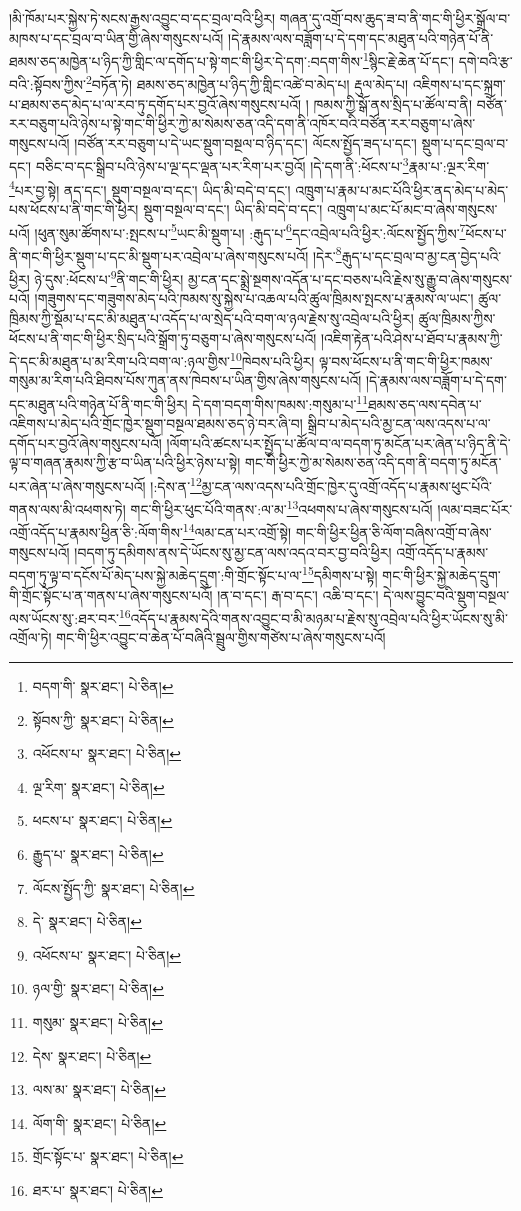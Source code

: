 །མི་ཁོམ་པར་སྐྱེས་ཏེ་སངས་རྒྱས་འབྱུང་བ་དང་བྲལ་བའི་ཕྱིར། གཞན་དུ་འགྲོ་བས་ཆུད་ཟ་བ་ནི་གང་གི་ཕྱིར་སྒྲོལ་བ་མཁས་པ་དང་བྲལ་བ་ཡིན་གྱི་ཞེས་གསུངས་པའོ། །དེ་རྣམས་ལས་བཟློག་པ་དེ་དག་དང་མཐུན་པའི་གཉེན་པོ་ནི་ཐམས་ཅད་མཁྱེན་པ་ཉིད་ཀྱི་གླིང་ལ་དགོད་པ་སྟེ་གང་གི་ཕྱིར་དེ་དག་:བདག་གིས་\footnote{བདག་གི་  སྣར་ཐང་།  པེ་ཅིན། }སྙིང་རྗེ་ཆེན་པོ་དང་། དགེ་བའི་རྩ་བའི་:སྟོབས་ཀྱིས་\footnote{སྟོབས་ཀྱི་  སྣར་ཐང་།  པེ་ཅིན། }བཏོན་ཏེ། ཐམས་ཅད་མཁྱེན་པ་ཉིད་ཀྱི་གླིང་འཚེ་བ་མེད་པ། རྡུལ་མེད་པ། འཇིགས་པ་དང་སྐྲག་པ་ཐམས་ཅད་མེད་པ་ལ་རབ་ཏུ་དགོད་པར་བྱའོ་ཞེས་གསུངས་པའོ། །
ཁམས་ཀྱི་སྒོ་ནས་སྲིད་པ་ཚོལ་བ་ནི། བཙོན་རར་བཅུག་པའི་ཉེས་པ་སྟེ་གང་གི་ཕྱིར་ཀྱེ་མ་སེམས་ཅན་འདི་དག་ནི་འཁོར་བའི་བཙོན་རར་བཅུག་པ་ཞེས་གསུངས་པའོ། །བཙོན་རར་བཅུག་པ་དེ་ཡང་སྡུག་བསྔལ་བ་ཉིད་དང་། ལོངས་སྤྱོད་ཟད་པ་དང་། སྡུག་པ་དང་བྲལ་བ་དང་། བཅིང་བ་དང་སྒྲིབ་པའི་ཉེས་པ་ལྔ་དང་ལྡན་པར་རིག་པར་བྱའོ། །དེ་དག་ནི་:ཕོངས་པ་\footnote{འཕོངས་པ་  སྣར་ཐང་།  པེ་ཅིན། }རྣམ་པ་:ལྔར་རིག་\footnote{ལྔ་རིག་  སྣར་ཐང་།  པེ་ཅིན། }པར་བྱ་སྟེ། ནད་དང་། སྡུག་བསྔལ་བ་དང་། ཡིད་མི་བདེ་བ་དང་། འཁྲུག་པ་རྣམ་པ་མང་པོའི་ཕྱིར་ནད་མེད་པ་མེད་པས་ཕོངས་པ་ནི་གང་གི་ཕྱིར། སྡུག་བསྔལ་བ་དང་། ཡིད་མི་བདེ་བ་དང་། འཁྲུག་པ་མང་པོ་མང་བ་ཞེས་གསུངས་པའོ། །ཕུན་སུམ་ཚོགས་པ་:སྤངས་པ་\footnote{ཕངས་པ་  སྣར་ཐང་།  པེ་ཅིན། }ཡང་མི་སྡུག་པ། :རྒུད་པ་\footnote{རྒྱུད་པ་  སྣར་ཐང་།  པེ་ཅིན། }དང་འབྲེལ་པའི་ཕྱིར་:ལོངས་སྤྱོད་ཀྱིས་\footnote{ལོངས་སྤྱོད་ཀྱི་  སྣར་ཐང་།  པེ་ཅིན། }ཕོངས་པ་ནི་གང་གི་ཕྱིར་སྡུག་པ་དང་མི་སྡུག་པར་འབྲེལ་པ་ཞེས་གསུངས་པའོ། །དེར་\footnote{དེ་  སྣར་ཐང་།  པེ་ཅིན། }རྒུད་པ་དང་བྲལ་བ་མྱ་ངན་བྱེད་པའི་ཕྱིར། ཉེ་དུས་:ཕོངས་པ་\footnote{འཕོངས་པ་  སྣར་ཐང་།  པེ་ཅིན། }ནི་གང་གི་ཕྱིར། མྱ་ངན་དང་སྨྲེ་སྔགས་འདོན་པ་དང་བཅས་པའི་རྗེས་སུ་རྒྱུ་བ་ཞེས་གསུངས་པའོ། །གཟུགས་དང་གཟུགས་མེད་པའི་ཁམས་སུ་སྐྱེས་པ་འཆལ་པའི་ཚུལ་ཁྲིམས་སྤངས་པ་རྣམས་ལ་ཡང་། ཚུལ་ཁྲིམས་ཀྱི་སྡོམ་པ་དང་མི་མཐུན་པ་འདོད་པ་ལ་སྲེད་པའི་བག་ལ་ཉལ་རྗེས་སུ་འབྲེལ་པའི་ཕྱིར། ཚུལ་ཁྲིམས་ཀྱིས་ཕོངས་པ་ནི་གང་གི་ཕྱིར་སྲིད་པའི་སྒྲོག་ཏུ་བཅུག་པ་ཞེས་གསུངས་པའོ། །འཇིག་རྟེན་པའི་ཤེས་པ་ཐོབ་པ་རྣམས་ཀྱི་དེ་དང་མི་མཐུན་པ་མ་རིག་པའི་བག་ལ་:ཉལ་གྱིས་\footnote{ཉལ་གྱི་  སྣར་ཐང་།  པེ་ཅིན། }ཁེབས་པའི་ཕྱིར། ལྟ་བས་ཕོངས་པ་ནི་གང་གི་ཕྱིར་ཁམས་གསུམ་མ་རིག་པའི་ཐིབས་པོས་ཀུན་ནས་ཁེབས་པ་ཡིན་གྱིས་ཞེས་གསུངས་པའོ། །དེ་རྣམས་ལས་བཟློག་པ་དེ་དག་དང་མཐུན་པའི་གཉེན་པོ་ནི་གང་གི་ཕྱིར། དེ་དག་བདག་གིས་ཁམས་:གསུམ་པ་\footnote{གསུམ་  སྣར་ཐང་།  པེ་ཅིན། }ཐམས་ཅད་ལས་དབེན་པ་འཇིགས་པ་མེད་པའི་གྲོང་ཁྱེར་སྡུག་བསྔལ་ཐམས་ཅད་ཉེ་བར་ཞི་བ། སྒྲིབ་པ་མེད་པའི་མྱ་ངན་ལས་འདས་པ་ལ་དགོད་པར་བྱའོ་ཞེས་གསུངས་པའོ། །ལོག་པའི་ཚངས་པར་སྤྱོད་པ་ཚོལ་བ་ལ་བདག་ཏུ་མངོན་པར་ཞེན་པ་ཉིད་ནི་དེ་ལྟ་བ་གཞན་རྣམས་ཀྱི་རྩ་བ་ཡིན་པའི་ཕྱིར་ཉེས་པ་སྟེ། གང་གི་ཕྱིར་ཀྱེ་མ་སེམས་ཅན་འདི་དག་ནི་བདག་ཏུ་མངོན་པར་ཞེན་པ་ཞེས་གསུངས་པའོ། །:དེས་ན་\footnote{དེས་  སྣར་ཐང་།  པེ་ཅིན། }མྱ་ངན་ལས་འདས་པའི་གྲོང་ཁྱེར་དུ་འགྲོ་འདོད་པ་རྣམས་ཕུང་པོའི་གནས་ལས་མི་འཕགས་ཏེ། གང་གི་ཕྱིར་ཕུང་པོའི་གནས་:ལ་མ་\footnote{ལས་མ་  སྣར་ཐང་།  པེ་ཅིན། }འཕགས་པ་ཞེས་གསུངས་པའོ། །ལམ་བཟང་པོར་འགྲོ་འདོད་པ་རྣམས་ཕྱིན་ཅི་:ལོག་གིས་\footnote{ལོག་གི་  སྣར་ཐང་།  པེ་ཅིན། }ལམ་ངན་པར་འགྲོ་སྟེ། གང་གི་ཕྱིར་ཕྱིན་ཅི་ལོག་བཞིས་འགྲོ་བ་ཞེས་གསུངས་པའོ། །བདག་ཏུ་དམིགས་ནས་དེ་ཡོངས་སུ་མྱ་ངན་ལས་འདའ་བར་བྱ་བའི་ཕྱིར། འགྲོ་འདོད་པ་རྣམས་བདག་ཏུ་ལྟ་བ་དངོས་པོ་མེད་པས་སྐྱེ་མཆེད་དྲུག་:གི་གྲོང་སྟོང་པ་ལ་\footnote{གྲོང་སྟོང་པ་  སྣར་ཐང་།  པེ་ཅིན། }དམིགས་པ་སྟེ། གང་གི་ཕྱིར་སྐྱེ་མཆེད་དྲུག་གི་གྲོང་སྟོང་པ་ན་གནས་པ་ཞེས་གསུངས་པའོ། །ན་བ་དང་། རྒ་བ་དང་། འཆི་བ་དང་། དེ་ལས་བྱུང་བའི་སྡུག་བསྔལ་ལས་ཡོངས་སུ་:ཐར་བར་\footnote{ཐར་པ་  སྣར་ཐང་།  པེ་ཅིན། }འདོད་པ་རྣམས་དེའི་གནས་འབྱུང་བ་མི་མཉམ་པ་རྗེས་སུ་འབྲེལ་པའི་ཕྱིར་ཡོངས་སུ་མི་འགྲོལ་ཏེ། གང་གི་ཕྱིར་འབྱུང་བ་ཆེན་པོ་བཞིའི་སྦྲུལ་གྱིས་གཙེས་པ་ཞེས་གསུངས་པའོ། 